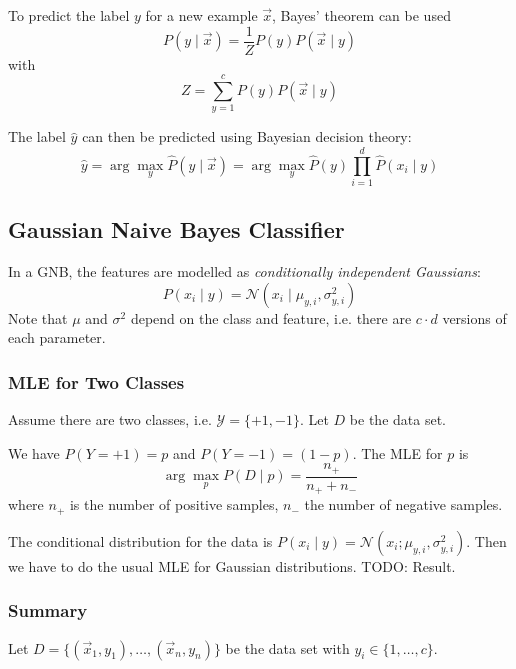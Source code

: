 To predict the label $y$ for a new
example $\vec{x}$,
Bayes' theorem can be used
\begin{equation*}
P(y \mid \vec{x}) =
\frac{1}{Z} P(y) P(\vec{x} \mid y)
\end{equation*}
with
\begin{equation*}
Z = \sum_{y=1}^c{
	P(y) P(\vec{x} \mid y)
}
\end{equation*}

The label $\hat{y}$ can then be
predicted using Bayesian decision theory:
\begin{equation*}
\hat{y} =
\arg\max_y{\hat{P}(y \mid \vec{x})} =
\arg\max_y{\hat{P}(y) \prod_{i=1}^d{\hat{P}(x_i \mid y)}}
\end{equation*}


\subsection{Gaussian Naive Bayes Classifier}
In a GNB, the features are modelled
as \emph{conditionally independent Gaussians}:
\begin{equation*}
P(x_i \mid y)
= \mathcal{N}(x_i \mid \mu_{y,i}, \sigma^2_{y, i})
\end{equation*}
Note that $\mu$ and $\sigma^2$
depend on the class and feature,
i.e. there are $c \cdot d$
versions of each parameter.

\subsubsection{MLE for Two Classes}
Assume there are two classes,
i.e. $\mathcal{Y} = \{+1, -1\}$.
Let $D$ be the data set.

We have $P(Y = +1) = p$ and
$P(Y = -1) = (1 - p)$.
The MLE for $p$ is
\begin{equation*}
\arg\max_p{P(D \mid p)}
= \frac{n_+}{n_+ + n_-}
\end{equation*}
where $n_+$ is the number of positive
samples, $n_-$ the number of negative
samples.

The conditional distribution for the
data is $P(x_i \mid y) = \mathcal{N}(x_i; \mu_{y, i}, \sigma^2_{y, i})$.
Then we have to do the usual MLE for
Gaussian distributions.
TODO: Result.

\subsubsection{Summary}
Let
$D = \{(\vec{x}_1, y_1), \dotsc, (\vec{x}_n, y_n)\}$
be the data set
with $y_i \in \{1, \dotsc, c\}$.

